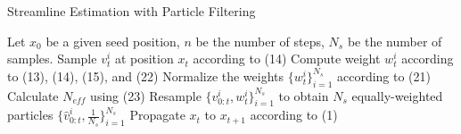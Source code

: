 \begin{algorithm}[h]
\caption{Streamline Estimation with Particle Filtering} \label{algo:pf}
\begin{algorithmic} [1]

\State Let $x_0$ be a given seed position, $n$ be the number of steps, $N_s$ be the number of samples.
\State Sample $v_t^i$ at position $x_t$ according to (14)
\State Compute weight $w_t^i$ according to (13), (14), (15), and (22)
\EndFor
\State Normalize the weights $\{w_t^i\}_{i=1}^{N_s}$ according to (21)
\State Calculate $N_{eff}$ using (23)
\State Resample $\{ v_{0:t}^i,w_t^i\} _{i = 1}^{{N_s}}$ to obtain $N_s$ equally-weighted particles $\{ \hat{v}_{0:t}^i,\frac{1}{N_s}\} _{i = 1}^{{N_s}}$
\EndIf
\State Propagate $x_t$ to $x_{t+1}$ according to (1)
\EndFor

\end{algorithmic}
\end{algorithm}
